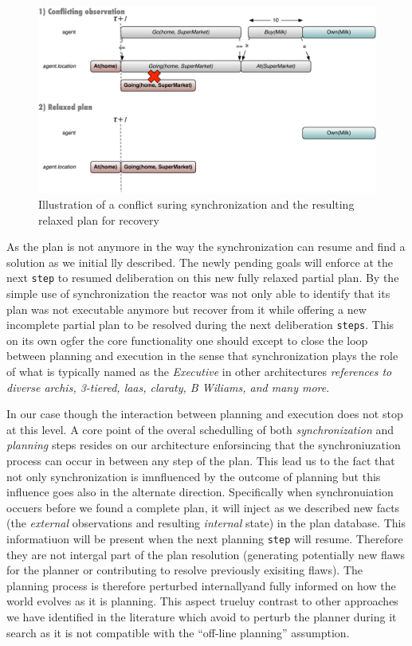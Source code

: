 \begin{figure}[!htbp]
  \centering
  \includegraphics[width=0.7\columnwidth]{figs/shoping_exec_relax}  
  \caption{Illustration of a conflict suring synchronization and the
    resulting relaxed plan for recovery} 
  \label{fig:shop:relax}
\end{figure}

As the plan is not anymore in the way the synchronization can resume
and find a solution as we initial lly described. The newly pending
goals will enforce at the next \texttt{step} to resumed deliberation
on this new fully relaxed partial plan. By the simple use of
synchronization the reactor was not only able to identify that its
plan was not executable anymore but recover from it while offering a
new incomplete partial plan to be resolved during the next
deliberation \texttt{steps}. This on its own ogfer the core
functionality one should except to close the loop between planning and
execution in the sense that synchronization plays the role of what is
typically named as the {\em Executive} in other architectures
{\em\color{red} references to diverse archis, 3-tiered, laas, claraty,
  B Wiliams, and many more}.

In our case though the interaction between planning and execution does
not stop at this level. A core point of the overal schedulling of both
{\em synchronization} and {\em planning} steps resides on our
architecture enforsincing that the synchroniuzation process can occur
in between any step of the plan. This lead us to the fact that not
only synchronization is imnfluenced by the outcome of planning but
this influence goes also in the alternate direction. Specifically when
synchronuiation occuers before we found a complete plan, it will
inject as we described new facts (the {\em external} observations and
resulting {\em internal} state) in the plan database. This
informatiuon will be present when the next planning \texttt{step} will
resume. Therefore they are not intergal part of the plan resolution
(generating potentially new flaws for the planner or contributing to
resolve previously exisiting flaws). The planning process is therefore
perturbed internallyand fully informed on how the world evolves as it
is planning.  This aspect trueluy contrast to other approaches we have
identified in the literature which avoid to perturb the planner during
it search as it is not compatible with the ``off-line planning''
assumption.

